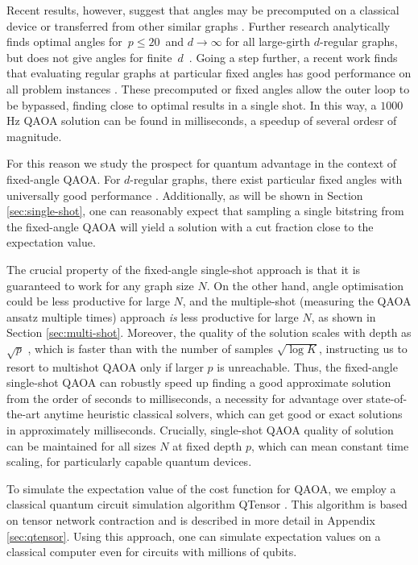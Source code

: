  Recent results, however, suggest that angles may be precomputed on a classical device \cite{streif2019training} or transferred from other similar graphs \cite{galda2021transferability}.
 Further research analytically finds optimal angles for~$p\leq20$~and $d\to\infty$ 
 for all large-girth $d$-regular graphs, but does not give angles for finite~$d$~\cite{Basso2022}.
 Going a step further, a recent work finds that evaluating regular graphs at particular fixed angles has good performance on all problem instances \cite{Wurtz_guarantee}. These precomputed or fixed angles allow the outer loop to be bypassed, finding close to optimal results in a single shot. In this way, a $1000$ Hz QAOA solution can be found in  milliseconds, a speedup of several ordesr of magnitude. 


For this reason we study the prospect for quantum advantage in the context of fixed-angle QAOA. For $d$-regular graphs, there exist particular fixed angles with universally good performance \cite{wurtz2021fixed}. 
Additionally, as will be shown in Section \ref{sec:single-shot}, one can reasonably expect that sampling a single bitstring from the fixed-angle QAOA will yield a solution with a cut fraction close to the expectation value.

The crucial property of the fixed-angle single-shot approach is that it is guaranteed to work for any graph size $N$.
On the other hand, angle optimisation could be less productive for large $N$, and the multiple-shot (measuring the QAOA ansatz multiple times) approach \textit{is} less productive for large $N$, as shown in Section \ref{sec:multi-shot}.
Moreover, the quality of the solution scales with depth as $\sqrt p$ \cite{wurtz2021fixed}, which is faster than with the number of samples $\sqrt{\log K}$, instructing us to resort to multishot QAOA only if larger $p$ is unreachable.
Thus, the fixed-angle single-shot QAOA can robustly speed up finding a good approximate solution from the order of seconds to milliseconds, a necessity for advantage over state-of-the-art anytime heuristic classical solvers, which can get good or exact solutions in approximately milliseconds. Crucially, single-shot QAOA quality of solution can be maintained for all sizes $N$ at fixed depth $p$, which can mean constant time scaling, for particularly capable quantum devices.



To simulate the expectation value of the cost function for 
QAOA, we employ a classical quantum circuit simulation algorithm QTensor \cite{lykov2021large, lykov_diagonal, LykovGPU}.
This algorithm is based on tensor network contraction and is described in more detail in Appendix \ref{sec:qtensor}.
Using this approach, one can simulate expectation values on a classical computer even for circuits with millions of qubits. 



